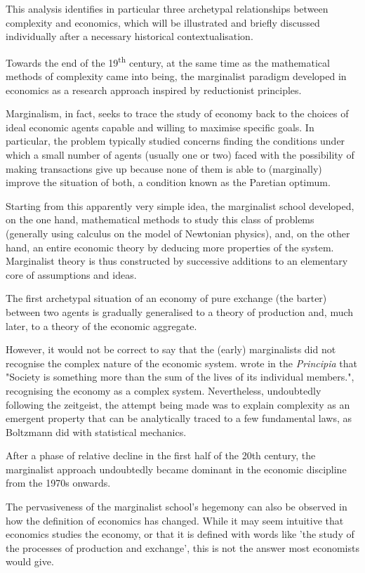 \documentclass[a4paper, headings=standardclasses]{scrartcl}
\begin{document}
This analysis identifies in particular three archetypal relationships between complexity and economics, which will be illustrated and briefly discussed individually after a necessary historical contextualisation.

Towards the end of the 19\textsuperscript{th} century, at the same time as the mathematical methods of complexity came into being, the marginalist paradigm developed in economics as a research approach inspired by reductionist principles.

Marginalism, in fact, seeks to trace the study of economy back to the choices of ideal economic agents capable and willing to maximise specific goals.
In particular, the problem typically studied concerns finding the conditions under which a small number of agents (usually one or two) faced with the possibility of making transactions give up because none of them is able to (marginally) improve the situation of both, a condition known as the Paretian optimum.

Starting from this apparently very simple idea, the marginalist school developed, on the one hand, mathematical methods to study this class of problems (generally using calculus on the model of Newtonian physics), and, on the other hand, an entire economic theory by deducing more properties of the system.
Marginalist theory is thus constructed by successive additions to an elementary core of assumptions and ideas.

The first archetypal situation of an economy of pure exchange (the barter) between two agents is gradually generalised to a theory of production and, much later, to a theory of the economic aggregate.

However, it would not be correct to say that the (early) marginalists did not recognise the complex nature of the economic system.
\textcite[p. 20]{marshall1988} wrote in the \textit{Principia} that "Society is something more than the sum of the lives of its individual members.", recognising the economy as a complex system.
Nevertheless, undoubtedly following the zeitgeist, the attempt being made was to explain complexity as an emergent property that can be analytically traced to a few fundamental laws, as Boltzmann did with statistical mechanics.

After a phase of relative decline in the first half of the 20th century, the marginalist approach undoubtedly became dominant in the economic discipline from the 1970s onwards.

The pervasiveness of the marginalist school's hegemony can also be observed in how the definition of economics has changed.
While it may seem intuitive that economics studies the economy, or that it is defined with words like 'the study of the processes of production and exchange', this is not the answer most economists would give.
\end{document}
